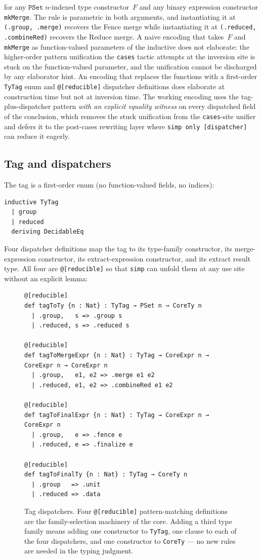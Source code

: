 \documentclass[acmsmall,screen,review,anonymous,nonacm]{acmart}
\newcommand{\PSet}{\texttt{PSet}}
\newcommand{\TyTag}{\texttt{TyTag}}
\begin{document}
for any $\PSet\;n$-indexed type constructor~$F$ and any binary expression constructor \texttt{mkMerge}. The rule is parametric in both arguments, and instantiating it at \texttt{(.group, .merge)} recovers the Fence merge while instantiating it at \texttt{(.reduced, .combineRed)} recovers the Reduce merge. A naive encoding that takes~$F$ and \texttt{mkMerge} as function-valued parameters of the inductive does not elaborate: the higher-order pattern unification the \texttt{cases} tactic attempts at the inversion site is stuck on the function-valued parameter, and the unification cannot be discharged by any elaborator hint. An encoding that replaces the functions with a first-order \TyTag{} enum and \texttt{@[reducible]} dispatcher definitions does elaborate at construction time but not at inversion time. The working encoding uses the tag-plus-dispatcher pattern \emph{with an explicit equality witness} on every dispatched field of the conclusion, which removes the stuck unification from the \texttt{cases}-site unifier and defers it to the post-cases rewriting layer where \texttt{simp only [dispatcher]} can reduce it eagerly.

\subsection{Tag and dispatchers}\label{sec:tag-and-dispatchers}

The tag is a first-order enum (no function-valued fields, no indices):

\begin{lstlisting}
inductive TyTag
  | group
  | reduced
  deriving DecidableEq
\end{lstlisting}

Four dispatcher definitions map the tag to its type-family constructor, its merge-expression constructor, its extract-expression constructor, and its extract result type. All four are \texttt{@[reducible]} so that \texttt{simp} can unfold them at any use site without an explicit lemma:

\begin{figure}[t]
\begin{lstlisting}
@[reducible]
def tagToTy {n : Nat} : TyTag → PSet n → CoreTy n
  | .group,   s => .group s
  | .reduced, s => .reduced s

@[reducible]
def tagToMergeExpr {n : Nat} : TyTag → CoreExpr n → CoreExpr n → CoreExpr n
  | .group,   e1, e2 => .merge e1 e2
  | .reduced, e1, e2 => .combineRed e1 e2

@[reducible]
def tagToFinalExpr {n : Nat} : TyTag → CoreExpr n → CoreExpr n
  | .group,   e => .fence e
  | .reduced, e => .finalize e

@[reducible]
def tagToFinalTy {n : Nat} : TyTag → CoreTy n
  | .group   => .unit
  | .reduced => .data
\end{lstlisting}
\caption{Tag dispatchers. Four \texttt{@[reducible]} pattern-matching definitions are the family-selection machinery of the core. Adding a third type family means adding one constructor to \TyTag{}, one clause to each of the four dispatchers, and one constructor to \texttt{CoreTy} --- no new rules are needed in the typing judgment.}
\label{fig:dispatchers}
\end{figure}
\end{document}

